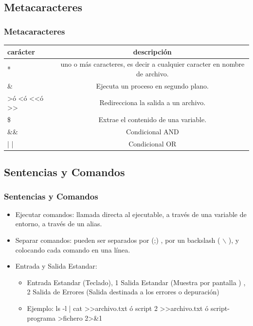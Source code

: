 \documentclass{beamer}
\begin{document}
\subsection{Metacaracteres}
\begin{frame}
\frametitle{ Metacaracteres }
	\begin{center}
	\begin{tabular*}{\textwidth}{ @{\extracolsep{\fill}}  | l | c |  }
		\hline
		car\'acter & descripci\'on  \\	
		\hline
		* & {\tiny  uno o m\'as caracteres, es decir a cualquier caracter en nombre de archivo. } \\	
		\hline
		\& & {\tiny Ejecuta un proceso en segundo plano.} \\	
		\hline
		\textgreater \'o \textless \'o \textless \textless \'o \textgreater \textgreater & {\tiny Redirecciona la salida a un archivo.} \\	
		\hline
		\$ & {\tiny Extrae el contenido de una variable.} \\	
		\hline
		\&\&  & {\tiny Condicional AND } \\	
		\hline
		| |  & {\tiny  Condicional OR} \\	
		\hline
	\end{tabular*}
	\end{center}
\end{frame}

\subsection{Sentencias y Comandos}
\begin{frame}
\frametitle{Sentencias y Comandos}
\begin{itemize}
\item \alert{Ejecutar comandos}: llamada directa al ejecutable, a trav\'es de una variable de entorno, a trav\'es de un alias.
\item \alert{Separar comandos}: pueden ser separados por (;) , por un backslash ( $\backslash$ ), y colocando cada comando en una l\'inea.
\item \alert{Entrada y Salida Estandar}:
	\begin{itemize}
	\item Entrada Estandar (Teclado), 1 Salida Estandar (Muestra por pantalla ) , 2 Salida de Errores (Salida destinada a los errores o depuraci\'on)
	\item Ejemplo: ls -l | cat \textgreater \textgreater archivo.txt \'o script 2 \textgreater \textgreater archivo.txt \'o   script-programa \textgreater fichero 2\textgreater\&1
	\end{itemize}
\end{itemize}
\end{frame}
\end{document}
